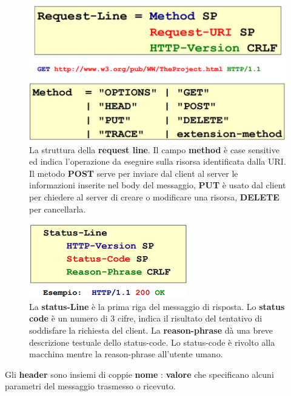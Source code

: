 \documentclass[11pt,a4paper,oneside]{book}
\theoremstyle{definition}
\begin{document}
\pagebreak

\begin{figure}[!h]
	\includegraphics[scale=0.3]{Immagini/Req_line.png}
	\centering
	\caption{La struttura della \textbf{request line}. Il campo \textbf{method} è case sensitive ed indica l'operazione da eseguire sulla risorsa identificata dalla URI. Il metodo \textbf{POST} serve per inviare dal client al server le
		informazioni inserite nel body del messaggio, \textbf{PUT} è usato dal client per chiedere al server di creare o modificare una risorsa, \textbf{DELETE} per cancellarla.}
\end{figure}
\begin{figure}[!h]
	\includegraphics[scale=0.4]{Immagini/Stat_line.png}
	\centering
	\caption{La \textbf{status-Line} è la prima riga del messaggio di risposta. Lo \textbf{status code} è un numero di 3 cifre, indica il risultato del tentativo di soddisfare la richiesta del client. La \textbf{reason-phrase} dà una breve descrizione testuale dello status-code. Lo status-code è rivolto alla macchina mentre la reason-phrase all'utente umano.}
\end{figure}
Gli \textbf{header} sono insiemi di coppie \textbf{nome} : \textbf{valore} che specificano
alcuni parametri del messaggio trasmesso o ricevuto.
\end{document}
